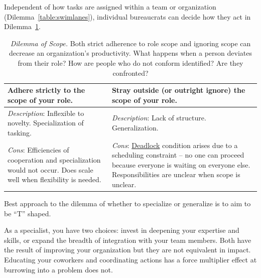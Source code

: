 Independent of how tasks are assigned within a team or organization (Dilemma~\ref{table:swimlanes}), individual bureaucrats can decide how they act in Dilemma~\ref{table:scope-of-activity}.



\begin{center}
\begin{table}[H] %
\begin{tabular}{ | m{\dilemmatablewidth}| m{\dilemmatablewidth} | }
  \hline
  \textbf{Adhere strictly to the scope of your role.} & 
  \textbf{Stray outside (or outright ignore) the scope of your role.} \\ 
  \hline
  \textit{Description}: Inflexible to novelty. Specialization of tasking. & 
  \textit{Description}: Lack of structure. Generalization. \\ 
  \hline
  \textit{Cons}: Efficiencies of cooperation and specialization would not occur. Does scale well when flexibility is needed.  & 
  \textit{Cons}: \href{https://en.wikipedia.org/wiki/Deadlock}{Deadlock} 
  \index{Wikipedia!\href{https://en.wikipedia.org/wiki/Deadlock}{Deadlock}}
  condition arises due to a scheduling constraint -- no one can proceed because everyone is waiting on everyone else. Responsibilities are unclear when scope is unclear. \\  
  \hline
\end{tabular}
\caption{
\textit{Dilemma of Scope.}
Both strict adherence to role scope and ignoring scope can decrease an organization's productivity. 
What happens when a person deviates from their role?
How are people who do not conform identified? Are they confronted?
}
\label{table:scope-of-activity}
\end{table}
\end{center}

Best approach to the dilemma of whether to specialize or generalize is to aim to be ``T'' shaped. 

As a specialist, you have two choices: invest in deepening your expertise and skills, or expand the breadth of integration with your team members. Both have the result of improving your organization but they are not equivalent in impact. Educating your coworkers and coordinating actions has a force multiplier effect at burrowing into a problem does not.

